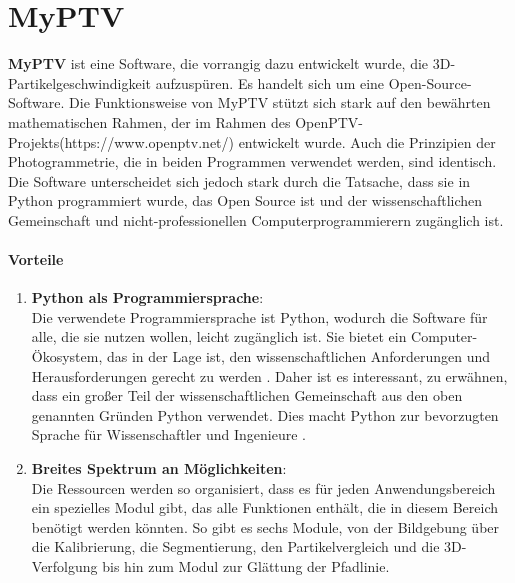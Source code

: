 	
\section{MyPTV}
\textbf{MyPTV} \cite{ron_shnapp_MyPTV} ist eine Software, die vorrangig dazu entwickelt wurde, die 3D-Partikel\-geschwindigkeit aufzuspüren. Es handelt sich um eine Open-Source-Software.
Die Funktionsweise von MyPTV stützt sich stark auf den bewährten mathematischen Rahmen, der im Rahmen des OpenPTV-Projekts(https://www.openptv.net/) entwickelt wurde. Auch die Prinzipien der Photogrammetrie, die in beiden Programmen verwendet werden, sind identisch. Die Software unterscheidet sich jedoch stark durch die Tatsache, dass sie in Python programmiert wurde, das Open Source ist und der wissenschaftlichen Gemeinschaft und nicht-professionellen Computerprogrammierern zugänglich ist.

	\paragraph{Vorteile}
		\begin{enumerate}
    			\item \textbf{Python als Programmiersprache}:\\
    			Die verwendete Programmiersprache ist Python, wodurch die Software für alle, die sie nutzen wollen, leicht zugänglich ist. Sie bietet ein Computer-Ökosystem, das in der Lage ist, den wissenschaftlichen Anforderungen und Herausforderungen gerecht zu werden \cite{5582063_Python_Ecosystem_Scientific_Computing} .
Daher ist es interessant, zu erwähnen, dass ein großer Teil der wissenschaftlichen Gemeinschaft aus den oben genannten Gründen Python verwendet. Dies macht Python zur bevorzugten Sprache für Wissenschaftler und Ingenieure \cite{5725235_Python_Scientists_and_Engineers}. 

    			\item \textbf{Breites Spektrum an Möglichkeiten}:\\
				Die Ressourcen werden so organisiert, dass es für jeden Anwendungsbereich ein spezielles Modul gibt, das alle Funktionen enthält, die in diesem Bereich benötigt werden könnten. So gibt es sechs Module, von der Bildgebung über die Kalibrierung, die Segmentierung, den Partikelvergleich und die 3D-Verfolgung bis hin zum Modul zur Glättung der Pfadlinie.
    			
    			
		\end{enumerate}
		
